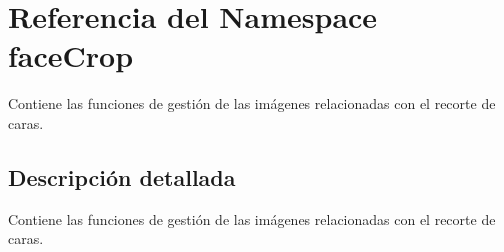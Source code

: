 \hypertarget{namespaceface_crop}{}\section{Referencia del Namespace face\+Crop}
\label{namespaceface_crop}


Contiene las funciones de gestión de las imágenes relacionadas con el recorte de caras.  




\subsection{Descripción detallada}
Contiene las funciones de gestión de las imágenes relacionadas con el recorte de caras. 

